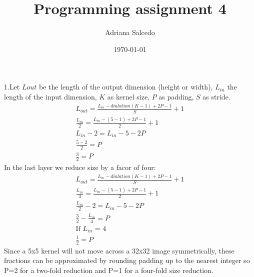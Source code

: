 \documentclass[12pt,letterpaper]{article} %
\title{\Large Programming assignment 4}
\author{\large Adriana Salcedo}
\date{\large \today}
\begin{document}
\maketitle
\section{}
\subsection{}

1.Let $L{out}$ be the length of the output dimension (height or width), $L_{in}$ the length of the input dimension, $K$ as kernel size, $P$ as padding, $S$ as stride. 
 \\
\begin{align*}
L_{out} = \frac{L_{in}-dialation(K -1) + 2P -1}{S} + 1\\
\frac{L_{in}}{2} = \frac{L_{in} - (5-1)+2P -1}{2} +1\\
L_{in} -2 = L_{in}-5-2P\\
\frac{5-2}{2} =P\\
\frac{3}{2}=P
\end{align*}
In the last layer we reduce size by a facor of four:
\begin{align*}
L_{out} = \frac{L_{in}-dialation(K -1) + 2P -1}{S} + 1\\
\frac{L_{in}}{4} = \frac{L_{in} - (5-1)+2P -1}{2} +1\\
\frac{L_{in}}{2} -2 = L_{in}-5-2P\\
\frac{3}{2}-\frac{L_{in}}{4} = P\\
\text{If $L_{in}$ = 4}\\
\frac{1}{2}=P
\end{align*}
Since a 5x5 kernel will not move across a 32x32 image symmetrically, these fractions can be approximated by rounding padding up to the nearest integer so P=2 for a two-fold reduction and P=1 for a four-fold size reduction.

\section{}
\end{document}

